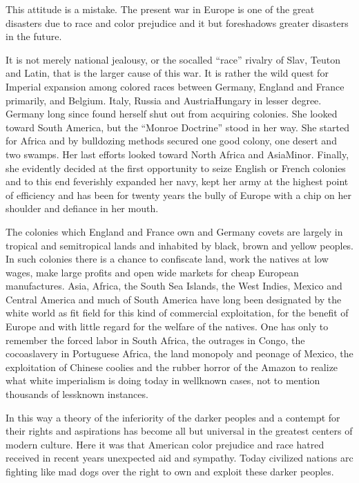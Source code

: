 \documentclass[letterpaper,10pt,english]{jupyterBook}
\begin{document}
\sphinxAtStartPar
This attitude is a mistake. The present war in Europe is one of the great disasters due to race and color prejudice and it but foreshadows greater disasters in the future.

\sphinxAtStartPar
It is not merely national jealousy, or the so\sphinxhyphen{}called “race” rivalry of Slav, Teuton and Latin, that is the larger cause of this war. It is rather the wild quest for Imperial expansion among colored races between Germany, England and France primarily, and Belgium. Italy, Russia and Austria\sphinxhyphen{}Hungary in lesser degree. Germany long since found herself shut out from acquiring colonies. She looked toward South America, but the “Monroe Doctrine” stood in her way. She started for Africa and by bulldozing methods secured one good colony, one desert and two swamps. Her last efforts looked toward North Africa and Asia\sphinxhyphen{}Minor. Finally, she evidently decided at the first opportunity to seize English or French colonies and to this end feverishly expanded her navy, kept her army at the highest point of efficiency and has been for twenty years the bully of Europe with a chip on her shoulder and defiance in her mouth.

\sphinxAtStartPar
The colonies which England and France own and Germany covets are largely in tropical and semi\sphinxhyphen{}tropical lands and inhabited by black, brown and yellow peoples. In such colonies there is a chance to confiscate land, work the natives at low wages, make large profits and open wide markets for cheap European manufactures. Asia, Africa, the South Sea Islands, the West Indies, Mexico and Central America and much of South America have long been designated by the white world as fit field for this kind of commercial exploitation, for the benefit of Europe and with little regard for the welfare of the natives. One has only to remember the forced labor in South Africa, the outrages in Congo, the cocoa\sphinxhyphen{}slavery in Portuguese Africa, the land monopoly and peonage of Mexico, the exploitation of Chinese coolies and the rubber horror of the Amazon to realize what white imperialism is doing to\sphinxhyphen{}day in well\sphinxhyphen{}known cases, not to mention thousands of less\sphinxhyphen{}known instances.

\sphinxAtStartPar
In this way a theory of the inferiority of the darker peoples and a contempt for their rights and aspirations has become all but universal in the greatest centers of modern culture. Here it was that American color prejudice and race hatred received in recent years unexpected aid and sympathy. To\sphinxhyphen{}day civilized nations arc fighting like mad dogs over the right to own and exploit these darker peoples.
\end{document}
